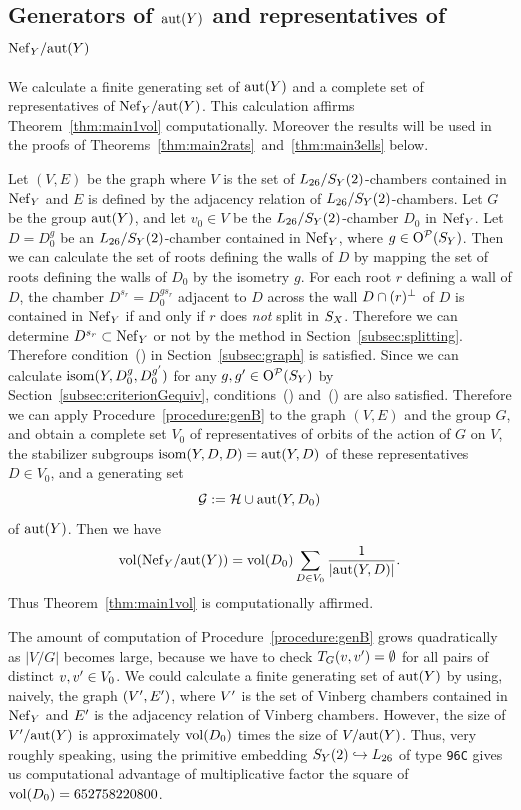\documentclass{amsart}
\numberwithin{procedure}{section}
\begin{document}
\subsection{Generators of $\mathord{\rm{aut}}(Y)$ and representatives of $\mathord{\rm Nef}_{Y}/\mathord{\rm{aut}}(Y)$}
\label{subsec:NefY}
%
 We calculate a finite generating set of $\mathord{\rm{aut}}(Y)$ and 
 a complete set of representatives  of $\mathord{\rm Nef}_{Y}/\mathord{\rm{aut}}(Y)$.
 This calculation affirms Theorem~\ref{thm:main1vol} computationally.
 Moreover 
the results will be used in 
the proofs of Theorems~\ref{thm:main2rats}~and~\ref{thm:main3ells} below.
%
\par
Let $(V, E)$ be the graph where
$V$ is the set of $L_{26}/S_Y(2)$-chambers contained in $\mathord{\rm Nef}_{Y}$
and  $E$ is defined by the adjacency relation of $L_{26}/S_Y(2)$-chambers.
Let $G$ be the group $\mathord{\rm{aut}}(Y)$,
and let $v_0\in V$ be the $L_{26}/S_Y(2)$-chamber $D_0$ in $\mathord{\rm Nef}_{Y}$.
Let   $D=D_0^g$ be an  $L_{26}/S_Y(2)$-chamber contained in $\mathord{\rm Nef}_{Y}$,
where $g\in \mathord{\mathrm{O}}^{\mathord{\mathcal P}}(S_{Y})$.
Then we can calculate  the set of roots defining the walls of  $D$
by mapping the set of roots  defining the walls of  $D_0$ by the isometry $g$.
For each root $r$ defining a wall of $D$,
the  chamber $D^{s_r}=D_0^{gs_r}$ adjacent to $D$ across the wall $D\cap(r)\sp{\perp}$
of $D$
is contained in $\mathord{\rm Nef}_{Y}$ if and only if 
$r$ does \emph{not} split in $S_{X}$.
Therefore we can determine $D^{s_r}\subset \mathord{\rm Nef}_{Y}$ or not by
the method in Section~\ref{subsec:splitting}.
Therefore condition~()
in Section~\ref{subsec:graph} is satisfied.
Since we can calculate $\mathord{\rm isom}(Y, D_0^g, D_0^{g\sp\prime})$
for any $g, g\sp\prime\in \mathord{\mathrm{O}}^{\mathord{\mathcal P}}(S_{Y})$ by Section~\ref{subsec:criterionGequiv}, 
conditions~() and~() are also satisfied.
Therefore we can apply Procedure~\ref{procedure:genB} to 
the graph $(V, E)$ and the group $G$,
and obtain
a complete set $V_0$ of representatives of orbits of the action of $G$ on $V$,
the stabilizer subgroups 
$\mathord{\rm isom}(Y, D, D)=\mathord{\rm{aut}}(Y, D)$ of these representatives $D\in V_0$, and
a generating set
\[
\mathord{\mathcal G}:=\mathord{\mathcal H}\cup \mathord{\rm{aut}}(Y, D_0)
\]
of $\mathord{\rm{aut}}(Y)$.
Then we have
%
\begin{equation}\label{eq:voloverAut}
\mathord{\rm{vol}}(\mathord{\rm Nef}_{Y}/\mathord{\rm{aut}}(Y))=\mathord{\rm{vol}}(D_0) \sum_{D\in V_0} \frac{1}{| \mathord{\rm{aut}}(Y, D)|}.
\end{equation}
%
Thus  Theorem~\ref{thm:main1vol} is computationally affirmed.
%
\begin{remark}\label{rem:computationsize}
The amount of computation of Procedure~\ref{procedure:genB} grows quadratically
as $|V/G|$
becomes large,
because we have to check $T_G(v, v\sp\prime)=\emptyset$
 for all pairs of distinct $v, v\sp\prime \in V_0$.
We could calculate a finite generating set
of $\mathord{\rm{aut}}(Y)$ 
by using, naively,
the graph $(V\sp\prime, E\sp\prime)$,
where $V\sp\prime$ is the set of Vinberg chambers
contained in $\mathord{\rm Nef}_{Y}$ and
$E\sp\prime$ is
the adjacency relation of Vinberg chambers.
However, 
the size of $V\sp\prime/\mathord{\rm{aut}}(Y)$
is  approximately $\mathord{\rm{vol}} (D_0)$ times the size of $V/\mathord{\rm{aut}}(Y)$.
Thus, very roughly speaking,   using the primitive embedding
$S_{Y}(2)\hookrightarrow L_{26}$ of type {\tt 96C}
gives us
computational advantage of
multiplicative factor the square of $\mathord{\rm{vol}}(D_0)=652758220800$.
\end{remark}
%
%
\end{document}
